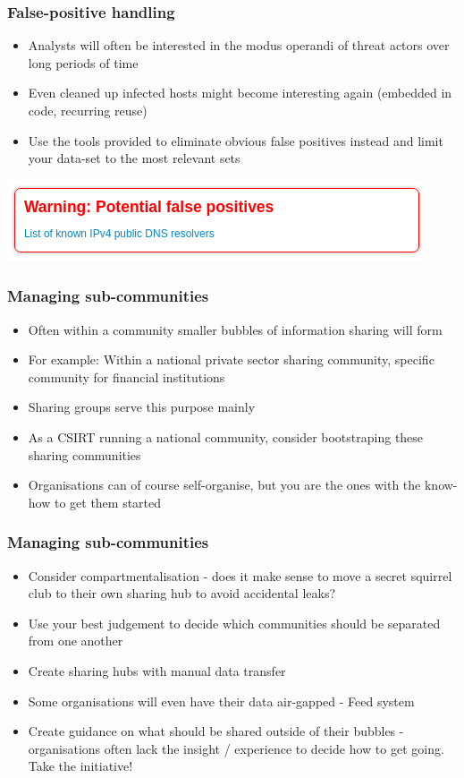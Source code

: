 \begin{frame}
\frametitle{False-positive handling}
\begin{itemize}
	\item Analysts will often be interested in the modus operandi of threat actors over long periods of time
	\item Even cleaned up infected hosts might become interesting again (embedded in code, recurring reuse)
	\item Use the tools provided to eliminate obvious false positives instead and limit your data-set to the most relevant sets
\end{itemize}
\includegraphics[scale=0.8]{screenshots/false-positive.png}
\end{frame}

\begin{frame}
\frametitle{Managing sub-communities}
\begin{itemize}
	\item Often within a community smaller bubbles of information sharing will form
	\item For example: Within a national private sector sharing community, specific community for financial institutions
	\item Sharing groups serve this purpose mainly
	\item As a CSIRT running a national community, consider bootstraping these sharing communities
	\item Organisations can of course self-organise, but you are the ones with the know-how to get them started
\end{itemize}
\end{frame}

\begin{frame}
\frametitle{Managing sub-communities}
\begin{itemize}
	\item Consider compartmentalisation - does it make sense to move a secret squirrel club to their own sharing hub to avoid accidental leaks?
	\item Use your best judgement to decide which communities should be separated from one another
	\item Create sharing hubs with manual data transfer
	\item Some organisations will even have their data air-gapped - Feed system
	\item Create guidance on what should be shared outside of their bubbles - organisations often lack the insight / experience to decide how to get going. Take the initiative!
\end{itemize}
\end{frame}

